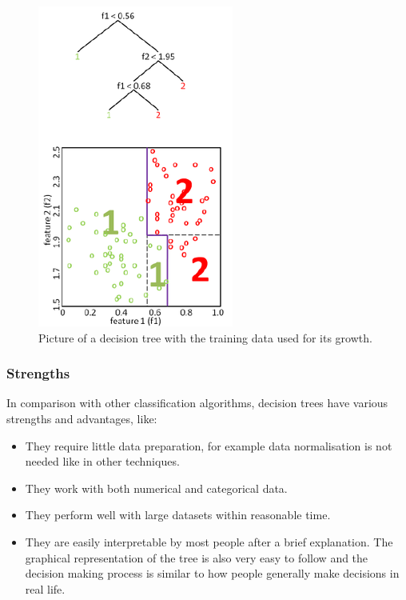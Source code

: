 \documentclass[11pt]{article}
\begin{document}
        \begin{figure}
          \centering
          \includegraphics[scale=0.7]{thesis_res/decision_tree.png}
          \caption{Picture of a decision tree with the training data used for its growth.\cite{digstaining}}
          \label{figure:decision_tree}
        \end{figure}
      \subsubsection{Strengths}
        In comparison with other classification algorithms, decision trees have various strengths and advantages, like:
        \begin{itemize}
        \item They require little data preparation, for example data normalisation is not needed like in other techniques.\cite{isl}
        \item They work with both numerical and categorical data.\cite{isl}
        \item They perform well with large datasets within reasonable time.\cite{breiman}
        \item They are easily interpretable by most people after a brief explanation. The graphical representation of the tree is also very easy to follow and the decision making process is similar to how people generally make decisions in real life.\cite{isl}
        \end{itemize}
\end{document}
